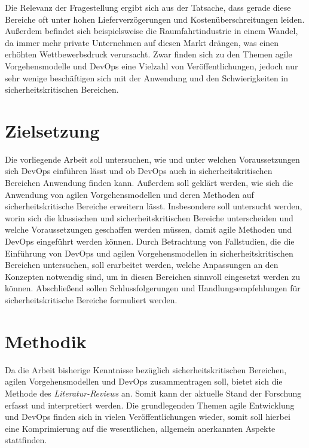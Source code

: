 Die Relevanz der Fragestellung ergibt sich aus der Tatsache, dass gerade diese Bereiche oft unter hohen Lieferverzögerungen und Kostenüberschreitungen leiden.
Außerdem befindet sich beispielsweise die Raumfahrtindustrie in einem Wandel, da immer mehr private Unternehmen auf diesen Markt drängen, was einen erhöhten Wettbewerbsdruck verursacht.
Zwar finden sich zu den Themen agile Vorgehensmodelle und DevOps eine Vielzahl von Veröffentlichungen, jedoch nur sehr wenige beschäftigen sich mit der Anwendung und den Schwierigkeiten in sicherheitskritischen Bereichen.

\section{Zielsetzung}

Die vorliegende Arbeit soll untersuchen, wie und unter welchen Voraussetzungen sich DevOps einführen lässt und ob DevOps auch in sicherheitskritischen Bereichen Anwendung finden kann.
Außerdem soll geklärt werden, wie sich die Anwendung von agilen Vorgehensmodellen und deren Methoden auf sicherheitskritische Bereiche erweitern lässt.
Insbesondere soll untersucht werden, worin sich die klassischen und sicherheitskritischen Bereiche unterscheiden und welche Voraussetzungen geschaffen werden müssen, damit agile Methoden und DevOps eingeführt werden können.
Durch Betrachtung von Fallstudien, die die Einführung von DevOps und agilen Vorgehensmodellen in sicherheitskritischen Bereichen untersuchen, soll erarbeitet werden, welche Anpassungen an den Konzepten notwendig sind, um in diesen Bereichen sinnvoll eingesetzt werden zu können.
Abschließend sollen Schlussfolgerungen und Handlungsempfehlungen für sicherheitskritische Bereiche formuliert werden.


\section{Methodik}

Da die Arbeit bisherige Kenntnisse bezüglich sicherheitskritischen Bereichen, agilen Vorgehensmodellen und DevOps zusammentragen soll, bietet sich die Methode des \emph{Literatur-Reviews} \parencite[vgl.][]{Fettke:2006aa} an.
Somit kann der aktuelle Stand der Forschung erfasst und interpretiert werden.
Die grundlegenden Themen agile Entwicklung und DevOps finden sich in vielen Veröffentlichungen wieder, somit soll hierbei eine Komprimierung auf die wesentlichen, allgemein anerkannten Aspekte stattfinden.

